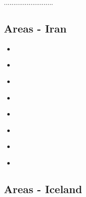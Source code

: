 ..........................
\subsection{Areas - Iran}

\begin{scriptsize}
\begin{itemize}
\item[\twothousandthree] 
\textcite{bocs03} \\
\item[\twothousandsix] 
\textcite{vech06} \\
\item[\twothousandten] 
\textcite{hamo10} \\
\item[\twothousandeleven] 
\textcite{yakm11} \\
\item[\twothousandthirteen] 
\textcite{nipc13} \\
\item[\twothousandfourteen] 
\textcite{frba14} \\
\item[\twothousandsixteen] 
\textcite{coyc16} \\
\item[\twothousandtwenty] 
\textcite{mofu20} \\
\end{itemize}
\end{scriptsize} 
 

\subsection{Areas - Iceland}

